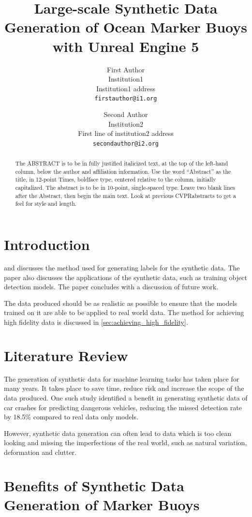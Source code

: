 \documentclass[10pt,twocolumn,letterpaper]{article}
\title{Large-scale Synthetic Data Generation of Ocean Marker Buoys with Unreal Engine 5}
\author{First Author\\
Institution1\\
Institution1 address\\
{\tt\small firstauthor@i1.org}
\and
Second Author\\
Institution2\\
First line of institution2 address\\
{\tt\small secondauthor@i2.org}
}
\def\confName{CVPR}
\begin{document}
\maketitle

\begin{abstract}
    The ABSTRACT is to be in fully justified italicized text, at the top of the left-hand column, below the author and affiliation information.
    Use the word ``Abstract'' as the title, in 12-point Times, boldface type, centered relative to the column, initially capitalized.
    The abstract is to be in 10-point, single-spaced type.
    Leave two blank lines after the Abstract, then begin the main text.
    Look at previous \confName abstracts to get a feel for style and length.
    \end{abstract}

\section{Introduction}


and discusses the method used for generating labels for the synthetic data. The paper also discusses the applications of the synthetic data, such as training object detection models. The paper concludes with a discussion of future work. 

The data produced should be as realistic as possible to ensure that the models trained on it are able to be applied to real world data. The method for achieving high fidelity data is discussed in \ref{sec:achieving_high_fidelity}.

\section{Literature Review}

The generation of synthetic data for machine learning tasks has taken place for many years. It takes place to save time, reduce risk and increase the scope of the data produced. One such study identified a benefit in generating synthetic data of car crashes for predicting dangerous vehicles, reducing the missed detection rate by 18.5\% compared to real data only models. \cite{Kim_Lee_Hwang_Suh_2019} 

However, synthetic data generation can often lead to data which is too clean looking and missing the imperfections of the real world, such as natural variation, deformation and clutter. \cite{Feng_2024_CVPR}

\section{Benefits of Synthetic Data Generation of Marker Buoys}
\end{document}
